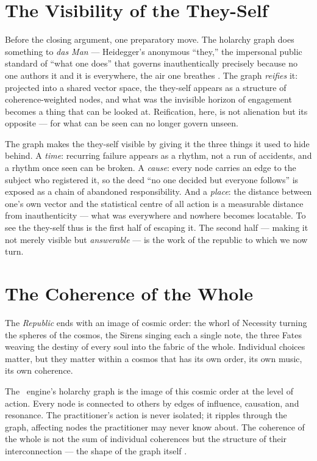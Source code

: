 \section{The Visibility of the They-Self}

Before the closing argument, one preparatory move. The holarchy graph does
something to \emph{das Man} --- Heidegger's anonymous ``they,'' the impersonal
public standard of ``what one does'' that governs inauthentically precisely
because no one authors it and it is everywhere, the air one breathes
\parencite[§27]{heidegger1962being}. The graph \emph{reifies} it: projected into a
shared vector space, the they-self appears as a structure of coherence-weighted
nodes, and what was the invisible horizon of engagement becomes a thing that can
be looked at. Reification, here, is not alienation but its opposite --- for what
can be seen can no longer govern unseen.

The graph makes the they-self visible by giving it the three things it used to
hide behind. A \emph{time}: recurring failure appears as a rhythm, not a run of
accidents, and a rhythm once seen can be broken. A \emph{cause}: every node
carries an edge to the subject who registered it, so the deed ``no one decided but
everyone follows'' is exposed as a chain of abandoned responsibility. And a
\emph{place}: the distance between one's own vector and the statistical centre of
all action is a measurable distance from inauthenticity --- what was everywhere
and nowhere becomes locatable. To see the they-self thus is the first half of
escaping it. The second half --- making it not merely visible but
\emph{answerable} --- is the work of the republic to which we now turn.

\section{The Coherence of the Whole}

The \emph{Republic} ends with an image of cosmic order: the whorl of Necessity
turning the spheres of the cosmos, the Sirens singing each a single note, the
three Fates weaving the destiny of every soul into the fabric of the whole.
Individual choices matter, but they matter within a cosmos that has its own
order, its own music, its own coherence.

The \physis\ engine's holarchy graph is the image of this cosmic order at the
level of action. Every node is connected to others by edges of influence,
causation, and resonance. The practitioner's action is never isolated; it
ripples through the graph, affecting nodes the practitioner may never know
about. The coherence of the whole is not the sum of individual coherences but
the structure of their interconnection --- the shape of the graph itself
\parencite{koestler1967ghost}.


